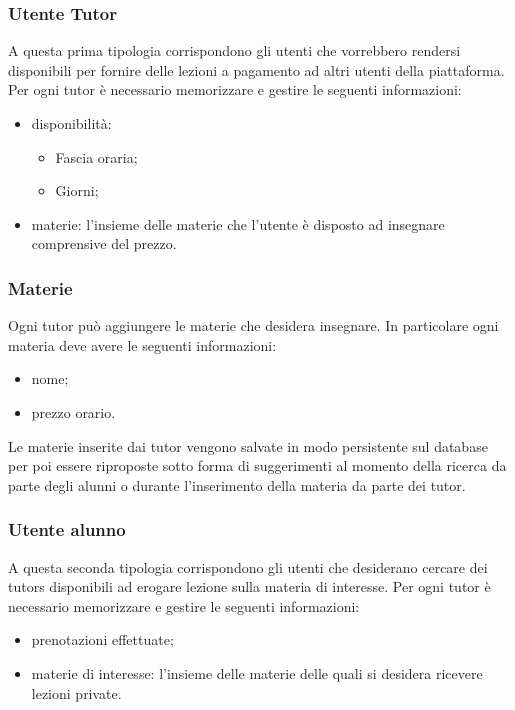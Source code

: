 \documentclass[12pt]{article}
\begin{document}
\subsubsection{Utente Tutor}
A questa prima tipologia corrispondono gli utenti che vorrebbero rendersi disponibili per fornire delle lezioni a pagamento ad altri utenti della piattaforma.
Per ogni tutor \`e necessario memorizzare e gestire le seguenti informazioni:
\begin{itemize}
	\item  disponibilità:
		\begin{itemize}
			\item Fascia oraria;
			\item Giorni;
		\end{itemize}
	\item materie: l'insieme delle materie che l'utente è disposto ad insegnare comprensive del prezzo.
\end{itemize}

\subsubsection{Materie}
Ogni tutor pu\`o aggiungere le materie che desidera insegnare. In particolare ogni materia deve avere le seguenti informazioni:
\begin{itemize}
	\item nome;
	\item prezzo orario.
\end{itemize}
Le materie inserite dai tutor vengono salvate in modo persistente sul database per poi essere riproposte sotto forma di suggerimenti al momento della ricerca da parte degli alunni o durante l'inserimento della materia da parte dei tutor.

\subsubsection{Utente alunno}
A questa seconda tipologia corrispondono gli utenti che desiderano cercare dei tutors disponibili ad erogare lezione sulla materia di interesse.
Per ogni tutor \`e necessario memorizzare e gestire le seguenti informazioni:
\begin{itemize}
	\item prenotazioni effettuate;
	\item materie di interesse: l'insieme delle materie delle quali si desidera ricevere lezioni private.
\end{itemize}
\end{document}
